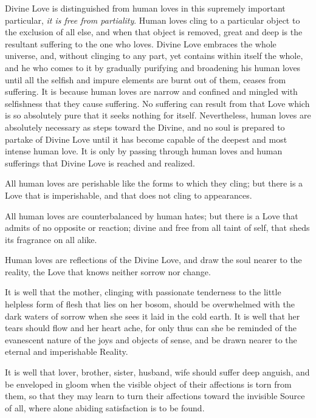 \documentclass[12pt,oneside]{scrbook}
\begin{document}
  Divine Love is distinguished from human loves in this supremely
  important particular, \emph{it is free from partiality}. Human loves
  cling to a particular object to the exclusion of all else, and when that
  object is removed, great and deep is the resultant suffering to the one
  who loves. Divine Love embraces the whole universe, and, without
  clinging to any part, yet contains within itself the whole, and he who
  comes to it by gradually purifying and broadening his human loves until
  all the selfish and impure elements are burnt out of them, ceases from
  suffering. It is because human loves are narrow and confined and mingled
  with selfishness that they cause suffering. No suffering can result from
  that Love which is so absolutely pure that it seeks nothing for itself.
  Nevertheless, human loves are absolutely necessary as steps toward the
  Divine, and no soul is prepared to partake of Divine Love until it has
  become capable of the deepest and most intense human love. It is only by
  passing through human loves and human sufferings that Divine Love is
  reached and realized.
  
  All human loves are perishable like the forms to which they cling; but
  there is a Love that is imperishable, and that does not cling to
  appearances.
  
  All human loves are counterbalanced by human hates; but there is a Love
  that admits of no opposite or reaction; divine and free from all taint
  of self, that sheds its fragrance on all alike.
  
  Human loves are reflections of the Divine Love, and draw the soul nearer
  to the reality, the Love that knows neither sorrow nor change.
  
  It is well that the mother, clinging with passionate tenderness to the
  little helpless form of flesh that lies on her bosom, should be
  overwhelmed with the dark waters of sorrow when she sees it laid in the
  cold earth. It is well that her tears should flow and her heart ache,
  for only thus can she be reminded of the evanescent nature of the joys
  and objects of sense, and be drawn nearer to the eternal and
  imperishable Reality.
  
  It is well that lover, brother, sister, husband, wife should suffer deep
  anguish, and be enveloped in gloom when the visible object of their
  affections is torn from them, so that they may learn to turn their
  affections toward the invisible Source of all, where alone abiding
  satisfaction is to be found.
  
\end{document}
